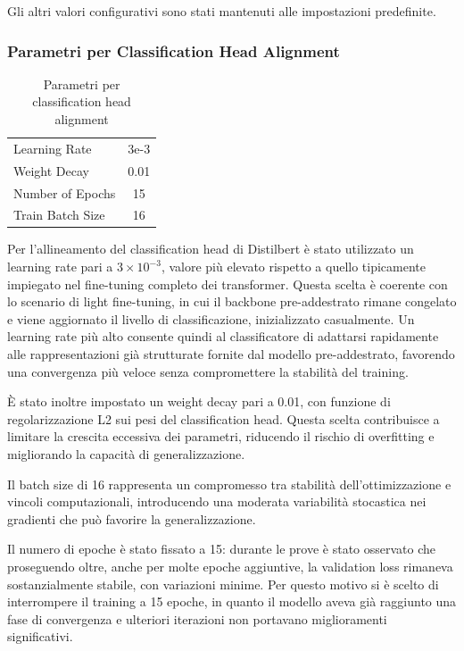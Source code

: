 \documentclass[a4paper,12pt]{article}
\begin{document}
Gli altri valori configurativi sono stati mantenuti alle impostazioni predefinite.

\subsubsection{Parametri per Classification Head Alignment}

\begin{table}[H]
    \centering
    \begin{tabular}{lc}
        \toprule
        Learning Rate    & 3e-3 \\
        Weight Decay     & 0.01 \\
        Number of Epochs & 15   \\
        Train Batch Size & 16   \\
        \bottomrule
    \end{tabular}
    \caption{Parametri per classification head alignment}
\end{table}

Per l'allineamento del classification head di Distilbert è stato utilizzato un learning rate pari a $3 \times 10^{-3}$, valore più elevato rispetto a quello tipicamente impiegato nel fine-tuning completo dei transformer. Questa scelta è coerente con lo scenario di light fine-tuning, in cui il backbone pre-addestrato rimane congelato e viene aggiornato il livello di classificazione, inizializzato casualmente. Un learning rate più alto consente quindi al classificatore di adattarsi rapidamente alle rappresentazioni già strutturate fornite dal modello pre-addestrato, favorendo una convergenza più veloce senza compromettere la stabilità del training.

È stato inoltre impostato un weight decay pari a 0.01, con funzione di regolarizzazione L2 sui pesi del classification head. Questa scelta contribuisce a limitare la crescita eccessiva dei parametri, riducendo il rischio di overfitting e migliorando la capacità di generalizzazione.

Il batch size di 16 rappresenta un compromesso tra stabilità dell’ottimizzazione e vincoli computazionali, introducendo una moderata variabilità stocastica nei gradienti che può favorire la generalizzazione.

Il numero di epoche è stato fissato a 15: durante le prove è stato osservato che proseguendo oltre, anche per molte epoche aggiuntive, la validation loss rimaneva sostanzialmente stabile, con variazioni minime. Per questo motivo si è scelto di interrompere il training a 15 epoche, in quanto il modello aveva già raggiunto una fase di convergenza e ulteriori iterazioni non portavano miglioramenti significativi.
\end{document}
